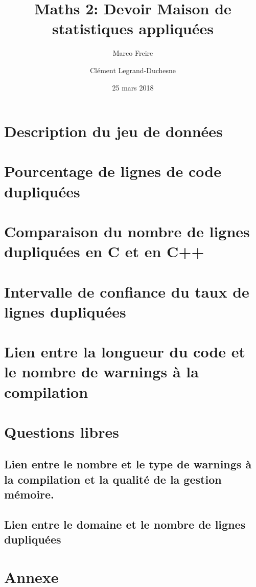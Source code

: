 \documentclass[a4paper,11pt]{article}%
\begin{document}
\title{Maths 2: Devoir Maison de statistiques appliquées}

\author{Marco Freire \and Clément Legrand-Duchesne}

\date{25 mars 2018}

\maketitle

\renewcommand{\contentsname}{Plan}
\tableofcontents
\clearpage

\section{Description du jeu de données}


\section{Pourcentage de lignes de code dupliquées}


\section{Comparaison du nombre de lignes dupliquées en C et en C++}


\section{Intervalle de confiance du taux de lignes dupliquées}


\section{Lien entre la longueur du code et le nombre de warnings à la compilation}


\section{Questions libres}
\subsection{Lien entre le nombre et le type de warnings à la compilation et la qualité de la gestion mémoire.}

\subsection{Lien entre le domaine et le nombre de lignes dupliquées}


\clearpage
\section*{Annexe}

\end{document}
